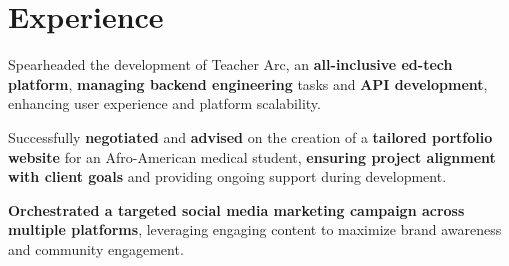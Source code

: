 \documentclass[]{deedy-resume-openfont}
\begin{document}
\begin{minipage}[t]{0.33\textwidth}

%
%

\end{minipage} 
\hfill
\begin{minipage}[t]{0.66\textwidth} 


\section{Experience}
\sectionsep

\sectionsep
\begin{tightemize}
\item Spearheaded the development of Teacher Arc, an \textbf{all-inclusive ed-tech platform}, \textbf{managing backend engineering} tasks and \textbf{API development}, enhancing user experience and platform scalability.
\item Successfully \textbf{negotiated} and \textbf{advised} on the creation of a \textbf{tailored portfolio website} for an Afro-American medical student, \textbf{ensuring project alignment with client goals} and providing ongoing support during development.
\item \textbf{Orchestrated a targeted social media marketing campaign across multiple platforms}, leveraging engaging content to maximize brand awareness and community engagement.
\end{tightemize}
\sectionsep


\end{minipage}
\end{document}
